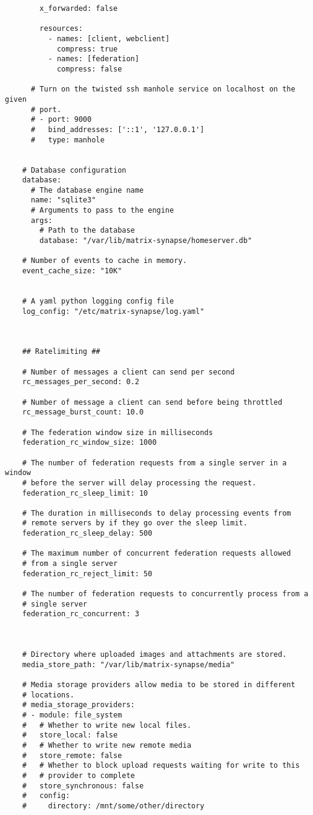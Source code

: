 \begin{lstlisting}
        x_forwarded: false
    
        resources:
          - names: [client, webclient]
            compress: true
          - names: [federation]
            compress: false
    
      # Turn on the twisted ssh manhole service on localhost on the given
      # port.
      # - port: 9000
      #   bind_addresses: ['::1', '127.0.0.1']
      #   type: manhole
    
    
    # Database configuration
    database:
      # The database engine name
      name: "sqlite3"
      # Arguments to pass to the engine
      args:
        # Path to the database
        database: "/var/lib/matrix-synapse/homeserver.db"
    
    # Number of events to cache in memory.
    event_cache_size: "10K"
    
    
    # A yaml python logging config file
    log_config: "/etc/matrix-synapse/log.yaml"
    
    
    
    ## Ratelimiting ##
    
    # Number of messages a client can send per second
    rc_messages_per_second: 0.2
    
    # Number of message a client can send before being throttled
    rc_message_burst_count: 10.0
    
    # The federation window size in milliseconds
    federation_rc_window_size: 1000
    
    # The number of federation requests from a single server in a window
    # before the server will delay processing the request.
    federation_rc_sleep_limit: 10
    
    # The duration in milliseconds to delay processing events from
    # remote servers by if they go over the sleep limit.
    federation_rc_sleep_delay: 500
    
    # The maximum number of concurrent federation requests allowed
    # from a single server
    federation_rc_reject_limit: 50
    
    # The number of federation requests to concurrently process from a
    # single server
    federation_rc_concurrent: 3
    
    
    
    # Directory where uploaded images and attachments are stored.
    media_store_path: "/var/lib/matrix-synapse/media"
    
    # Media storage providers allow media to be stored in different
    # locations.
    # media_storage_providers:
    # - module: file_system
    #   # Whether to write new local files.
    #   store_local: false
    #   # Whether to write new remote media
    #   store_remote: false
    #   # Whether to block upload requests waiting for write to this
    #   # provider to complete
    #   store_synchronous: false
    #   config:
    #     directory: /mnt/some/other/directory
    

\end{lstlisting}
